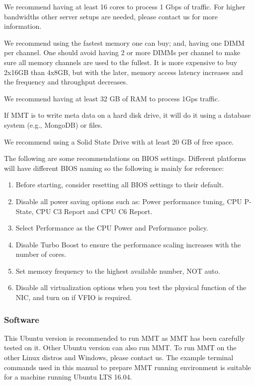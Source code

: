 \recommend We recommend having at least 16 cores to process 1 Gbps of traffic. For higher bandwidths other server setups are needed, please contact us for more information.

 We recommend using the fastest memory one can buy; and, having one DIMM per channel. One should avoid having 2 or more DIMMs per channel to make sure all memory channels are used to the fullest. It is more expensive to buy 2x16GB than 4x8GB, but with the later, memory access latency increases and the frequency and throughput decreases.

\recommend We recommend having at least 32 GB of RAM to process 1Gps traffic.

 If MMT is to write meta data on a hard disk drive, it will do it using a database system (e.g., MongoDB) or files.

\recommend We recommend using a Solid State Drive with at least 20 GB of free space.

The following are some recommendations on BIOS settings. Different platforms will have different BIOS naming so the following is mainly for reference:

\begin{enumerate}
    \item  Before starting, consider resetting all BIOS settings to their default.
    \item Disable all power saving options such as: Power performance tuning, CPU P-State, CPU C3 Report and CPU C6 Report.
    \item Select Performance as the CPU Power and Performance policy.
    \item Disable Turbo Boost to ensure the performance scaling increases with the number of cores.
    \item Set memory frequency to the highest available number, NOT auto.
    \item Disable all virtualization options when you test the physical function of the NIC, and turn on  if VFIO is required.
\end{enumerate}

\subsubsection{Software}

 This Ubuntu version is recommended to run MMT as MMT has been carefully tested on it. Other Ubuntu version can also run MMT. To run MMT on the other Linux distros and Windows, please contact us.
The example terminal commands used in this manual to prepare MMT running environment is suitable for a machine running Ubuntu LTS 16.04.

